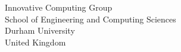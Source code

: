 Innovative Computing Group\\
School of Engineering and Computing Sciences\\
Durham University\\
United Kingdom
